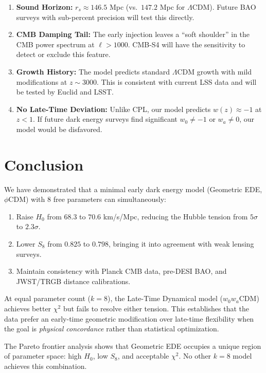 \begin{enumerate}
    \item \textbf{Sound Horizon:} $r_s \approx 146.5$ Mpc (vs.\ $147.2$ Mpc for $\Lambda$CDM). Future BAO surveys with sub-percent precision will test this directly.
    
    \item \textbf{CMB Damping Tail:} The early injection leaves a ``soft shoulder'' in the CMB power spectrum at $\ell > 1000$. CMB-S4 will have the sensitivity to detect or exclude this feature.
    
    \item \textbf{Growth History:} The model predicts standard $\Lambda$CDM growth with mild modifications at $z \sim 3000$. This is consistent with current LSS data and will be tested by Euclid and LSST.
    
    \item \textbf{No Late-Time Deviation:} Unlike CPL, our model predicts $w(z) \approx -1$ at $z < 1$. If future dark energy surveys find significant $w_0 \neq -1$ or $w_a \neq 0$, our model would be disfavored.
\end{enumerate}

\section{Conclusion}

We have demonstrated that a minimal early dark energy model (Geometric EDE, $\phi$CDM) with 8 free parameters can simultaneously:

\begin{enumerate}
    \item Raise $H_0$ from $68.3$ to $70.6$ km/s/Mpc, reducing the Hubble tension from $5\sigma$ to $2.3\sigma$.
    \item Lower $S_8$ from $0.825$ to $0.798$, bringing it into agreement with weak lensing surveys.
    \item Maintain consistency with Planck CMB data, pre-DESI BAO, and JWST/TRGB distance calibrations.
\end{enumerate}

At equal parameter count ($k = 8$), the Late-Time Dynamical model ($w_0w_a$CDM) achieves better $\chi^2$ but fails to resolve either tension. This establishes that the data prefer an early-time geometric modification over late-time flexibility when the goal is \emph{physical concordance} rather than statistical optimization.

The Pareto frontier analysis shows that Geometric EDE occupies a unique region of parameter space: high $H_0$, low $S_8$, and acceptable $\chi^2$. No other $k = 8$ model achieves this combination.


